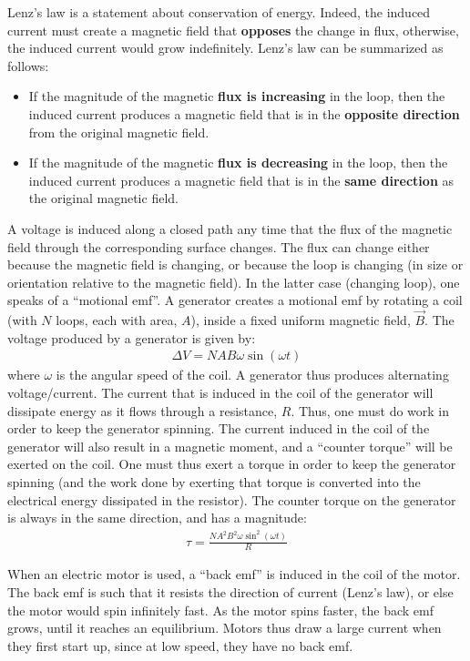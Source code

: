 \begin{chapterSummary}
Lenz's law is a statement about conservation of energy. Indeed, the induced current must create a magnetic field that \textbf{opposes} the change in flux, otherwise, the induced current would grow indefinitely. Lenz's law can be summarized as follows:
\begin{itemize}
\item If the magnitude of the magnetic \textbf{flux is increasing} in the loop, then the induced current produces a magnetic field that is in the \textbf{opposite direction} from the original magnetic field.
\item If the magnitude of the magnetic \textbf{flux is decreasing} in the loop, then the induced current produces a magnetic field that is in the \textbf{same direction} as the original magnetic field.
\end{itemize}

A voltage is induced along a closed path any time that the flux of the magnetic field through the corresponding surface changes. The flux can change either because the magnetic field is changing, or because the loop is changing (in size or orientation relative to the magnetic field). In the latter case (changing loop), one speaks of a ``motional emf''. A generator creates a motional emf by rotating a coil (with $N$ loops, each with area, $A$), inside a fixed uniform magnetic field, $\vec B$. The voltage produced by a generator is given by:
\begin{align*}
\Delta V = NAB\omega\sin(\omega t)
\end{align*}
where $\omega$ is the angular speed of the coil. A generator thus produces alternating voltage/current. The current that is induced in the coil of the generator will dissipate energy as it flows through a resistance, $R$. Thus, one must do work in order to keep the generator spinning. The current induced in the coil of the generator will also result in a magnetic moment, and a ``counter torque'' will be exerted on the coil. One must thus exert a torque in order to keep the generator spinning (and the work done by exerting that torque is converted into the electrical energy dissipated in the resistor). The counter torque on the generator is always in the same direction, and has a magnitude:
\begin{align*}
\tau = \frac{NA^2B^2\omega\sin^2(\omega t)}{R}
\end{align*}

When an electric motor is used, a ``back emf'' is induced in the coil of the motor. The back emf is such that it resists the direction of current (Lenz's law), or else the motor would spin infinitely fast. As the motor spins faster, the back emf grows, until it reaches an equilibrium. Motors thus draw a large current when they first start up, since at low speed, they have no back emf. 


\end{chapterSummary}
